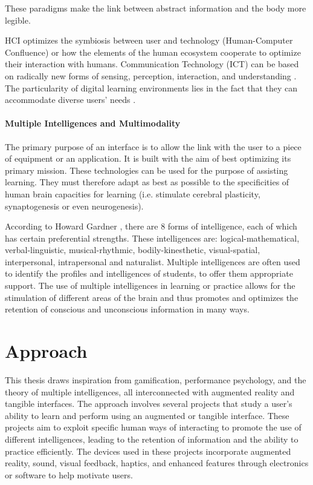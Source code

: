 These paradigms make the link between abstract information and the body more legible. 

HCI optimizes the symbiosis between user and technology (Human-Computer Confluence) or how the elements of the human ecosystem cooperate to optimize their interaction with humans. Communication Technology (ICT) can be based on radically new forms of sensing, perception, interaction, and understanding \cite{ferscha2007human}. The particularity of digital learning environments lies in the fact that they can accommodate diverse users' needs \cite{stephanidis2019seven}. 

\paragraph[short]{Multiple Intelligences and Multimodality}

The primary purpose of an interface is to allow the link with the user to a piece of equipment or an application. It is built with the aim of best optimizing its primary mission. These technologies can be used for the purpose of assisting learning. They must therefore adapt as best as possible to the specificities of human brain capacities for learning (i.e. stimulate cerebral plasticity, synaptogenesis or even neurogenesis). \cite[]{maes1993learning}

According to Howard Gardner \cite{gardner2004intelligences}, there are 8 forms of intelligence, each of which has certain preferential strengths. These intelligences are: logical-mathematical, verbal-linguistic, musical-rhythmic, bodily-kinesthetic, visual-spatial, interpersonal, intrapersonal and naturalist. Multiple intelligences are often used to identify the profiles and intelligences of students, to offer them appropriate support. The use of multiple intelligences in learning or practice allows for the stimulation of different areas of the brain and thus promotes and optimizes the retention of conscious and unconscious information in many ways. 

\section{Approach}

This thesis draws inspiration from gamification, performance psychology, and the theory of multiple intelligences, all interconnected with augmented reality and tangible interfaces.
The approach involves several projects that study a user's ability to learn and perform using an augmented or tangible interface. 
These projects aim to exploit specific human ways of interacting to promote the use of different intelligences, leading to the retention of information and the ability to practice efficiently. 
The devices used in these projects incorporate augmented reality, sound, visual feedback, haptics, and enhanced features through electronics or software to help motivate users. 

